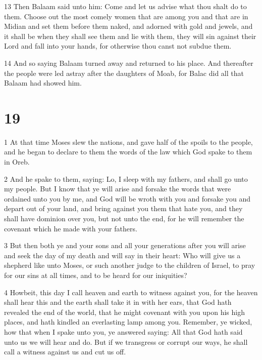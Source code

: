 \par 13 Then Balaam said unto him: Come and let us advise what thou shalt do to them. Choose out the most comely women that are among you and that are in Midian and set them before them naked, and adorned with gold and jewels, and it shall be when they shall see them and lie with them, they will sin against their Lord and fall into your hands, for otherwise thou canst not subdue them. 

\par 14 And so saying Balaam turned away and returned to his place. And thereafter the people were led astray after the daughters of Moab, for Balac did all that Balaam had showed him.

\chapter{19}

\par 1 At that time Moses slew the nations, and gave half of the spoils to the people, and he began to declare to them the words of the law which God spake to them in Oreb. 

\par 2 And he spake to them, saying: Lo, I sleep with my fathers, and shall go unto my people. But I know that ye will arise and forsake the words that were ordained unto you by me, and God will be wroth with you and forsake you and depart out of your land, and bring against you them that hate you, and they shall have dominion over you, but not unto the end, for he will remember the covenant which he made with your fathers. 

\par 3 But then both ye and your sons and all your generations after you will arise and seek the day of my death and will say in their heart: Who will give us a shepherd like unto Moses, or such another judge to the children of Israel, to pray for our sins at all times, and to be heard for our iniquities? 

\par 4 Howbeit, this day I call heaven and earth to witness against you, for the heaven shall hear this and the earth shall take it in with her ears, that God hath revealed the end of the world, that he might covenant with you upon his high places, and hath kindled an everlasting lamp among you. Remember, ye wicked, how that when I spake unto you, ye answered saying: All that God hath said unto us we will hear and do. But if we transgress or corrupt our ways, he shall call a witness against us and cut us off. 

